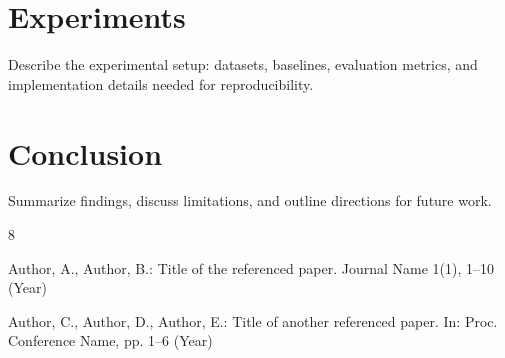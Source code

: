 \documentclass{llncs}
\begin{document}
\section{Experiments}
Describe the experimental setup: datasets, baselines, evaluation metrics, and implementation details needed for reproducibility.

\section{Conclusion}
Summarize findings, discuss limitations, and outline directions for future work.

\begin{thebibliography}{8}

Author, A., Author, B.: Title of the referenced paper. Journal Name 1(1), 1--10 (Year)

Author, C., Author, D., Author, E.: Title of another referenced paper. In: Proc. Conference Name, pp. 1--6 (Year)

\end{thebibliography}
\end{document}
